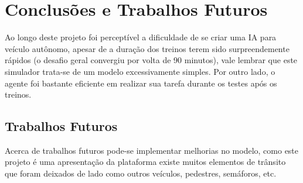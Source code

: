 \chapter*{Conclusões e Trabalhos Futuros}\label{cap:conclusao}

Ao longo deste projeto foi perceptível a dificuldade de se criar uma IA para veículo autônomo, apesar de a duração dos treinos terem sido surpreendemente rápidos (o desafio geral convergiu por volta de 90 minutos), vale lembrar que este simulador trata-se de um modelo excessivamente simples. Por outro lado, o agente foi bastante eficiente em realizar sua tarefa durante os testes após os treinos.

\section*{Trabalhos Futuros}

Acerca de trabalhos futuros pode-se implementar melhorias no modelo, como este projeto é uma apresentação da plataforma existe muitos elementos de trânsito que foram deixados de lado como outros veículos, pedestres, semáforos, etc.